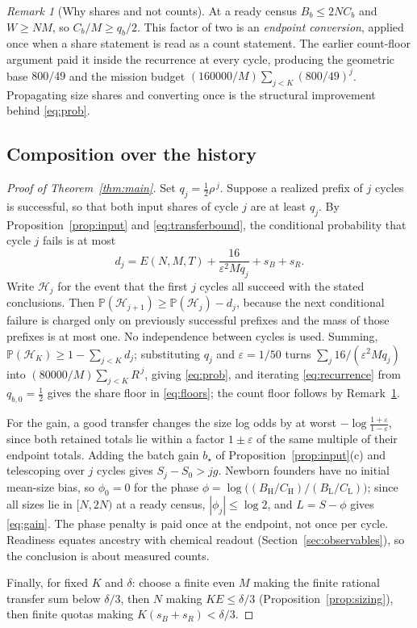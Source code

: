 \documentclass[11pt,a4paper]{article}
\theoremstyle{plain}
\theoremstyle{definition}
\theoremstyle{remark}
\newtheorem{remark}[theorem]{Remark}
\newcommand{\Prob}{\mathbb P}
\newcommand{\eps}{\varepsilon}
\newcommand{\lo}{\mathrm L}
\newcommand{\hi}{\mathrm H}
\begin{document}
\begin{remark}[Why shares and not counts]\label{rem:shares}
At a ready census $B_b\le2NC_b$ and $W\ge NM$, so $C_b/M\ge q_b/2$. This factor
of two is an \emph{endpoint conversion}, applied once when a share statement is
read as a count statement. The earlier count-floor argument paid it inside the
recurrence at every cycle, producing the geometric base $800/49$ and the
mission budget $(160000/M)\sum_{j<K}(800/49)^j$. Propagating size shares and
converting once is the structural improvement behind \eqref{eq:prob}.
\end{remark}

\subsection{Composition over the history}\label{sec:composition}

\begin{proof}[Proof of Theorem~\ref{thm:main}]
Set $q_j=\frac12\rho^{\,j}$. Suppose a realized prefix of $j$ cycles is
successful, so that both input shares of cycle $j$ are at least $q_j$. By
Proposition~\ref{prop:input} and \eqref{eq:transferbound}, the conditional
probability that cycle $j$ fails is at most
\begin{equation}\label{eq:dj}
d_j=E(N,M,T)+\frac{16}{\eps^2Mq_j}+s_B+s_R .
\end{equation}
Write $\mathcal H_j$ for the event that the first $j$ cycles all succeed with
the stated conclusions. Then
$\Prob(\mathcal H_{j+1})\ge\Prob(\mathcal H_j)-d_j$, because the next
conditional failure is charged only on previously successful prefixes and the
mass of those prefixes is at most one. No independence between cycles is used.
Summing, $\Prob(\mathcal H_K)\ge1-\sum_{j<K}d_j$; substituting $q_j$ and
$\eps=1/50$ turns $\sum_j16/(\eps^2Mq_j)$ into
$(80000/M)\sum_{j<K}R^{\,j}$, giving \eqref{eq:prob}, and iterating
\eqref{eq:recurrence} from $q_{b,0}=\frac12$ gives the share floor in
\eqref{eq:floors}; the count floor follows by Remark~\ref{rem:shares}.

For the gain, a good transfer changes the size log odds by at worst
$-\log\frac{1+\eps}{1-\eps}$, since both retained totals lie within a factor
$1\pm\eps$ of the same multiple of their endpoint totals. Adding the batch gain
$b_\star$ of Proposition~\ref{prop:input}(c) and telescoping over $j$ cycles
gives $S_j-S_0>jg$. Newborn founders have no initial mean-size bias, so
$\phi_0=0$ for the phase $\phi=\log\bigl((B_\hi/C_\hi)/(B_\lo/C_\lo)\bigr)$;
since all sizes lie in $[N,2N)$ at a ready census, $|\phi_j|\le\log2$, and
$L=S-\phi$ gives \eqref{eq:gain}. The phase penalty is paid once at the
endpoint, not once per cycle. Readiness equates ancestry with chemical readout
(Section~\ref{sec:observables}), so the conclusion is about measured counts.

Finally, for fixed $K$ and $\delta$: choose a finite even $M$ making the finite
rational transfer sum below $\delta/3$, then $N$ making $KE\le\delta/3$
(Proposition~\ref{prop:sizing}), then finite quotas making
$K(s_B+s_R)<\delta/3$.
\end{proof}
\end{document}
